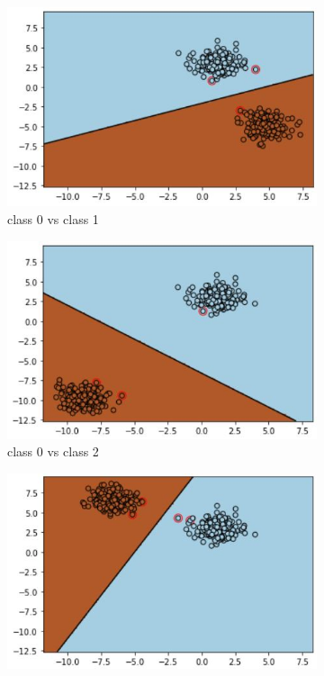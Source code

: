 \documentclass[11pt]{article}
\begin{document}
\begin{figure}[h!]
\centering
	\begin{subfigure}[b]{0.45\textwidth}
	\centering
	\includegraphics[scale=0.6]{dataset1a_linear_svm_01_ds.jpg}
	\caption{class 0 vs class 1}
	\label{fig:fig1.3.7.1}
	\end{subfigure}
	\begin{subfigure}[b]{0.45\textwidth}
	\centering
	\includegraphics[scale=0.6]{dataset1a_linear_svm_02_ds.jpg}
	\caption{class 0 vs class 2}
	\label{fig:fig1.3.7.2}
	\end{subfigure}
	\begin{subfigure}[b]{0.45\textwidth}
	\centering
	\includegraphics[scale=0.6]{dataset1a_linear_svm_03_ds.jpg}

\end{subfigure}
\end{figure}
\end{document}
